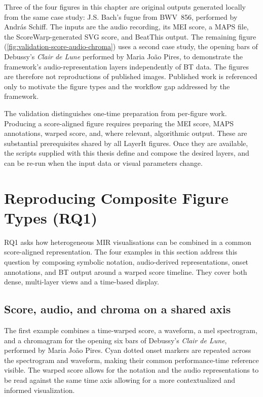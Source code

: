 Three of the four figures in this chapter are original outputs generated locally from the same case study: J.S. Bach's fugue from BWV~856, performed by Andr\'as Schiff. The inputs are the audio recording, its MEI score, a MAPS file, the ScoreWarp-generated SVG score, and BeatThis output. The remaining figure (\autoref{fig:validation-score-audio-chroma}) uses a second case study, the opening bars of Debussy's \textit{Clair de Lune} performed by Maria Jo\~ao Pires, to demonstrate the framework's audio-representation layers independently of BT data. The figures are therefore not reproductions of published images. Published work is referenced only to motivate the figure types and the workflow gap addressed by the framework.

The validation distinguishes one-time preparation from per-figure work. Producing a score-aligned figure requires preparing the MEI score, MAPS annotations, warped score, and, where relevant, algorithmic output. These are substantial prerequisites shared by all LayerIt figures. Once they are available, the scripts supplied with this thesis define and compose the desired layers, and can be re-run when the input data or visual parameters change.

\section{Reproducing Composite Figure Types (RQ1)}

RQ1 asks how heterogeneous MIR visualisations can be combined in a common score-aligned representation. The four examples in this section address this question by composing symbolic notation, audio-derived representations, onset annotations, and BT output around a warped score timeline. They cover both dense, multi-layer views and a time-based display.

\subsection{Score, audio, and chroma on a shared axis}

The first example combines a time-warped score, a waveform, a mel spectrogram, and a chromagram for the opening six bars of Debussy's \textit{Clair de Lune}, performed by Maria Jo\~ao Pires. Cyan dotted onset markers are repeated across the spectrogram and waveform, making their common performance-time reference visible. The warped score allows for the notation and the audio representations to be read against the same time axis allowing for a more contextualized and informed visualization. 

